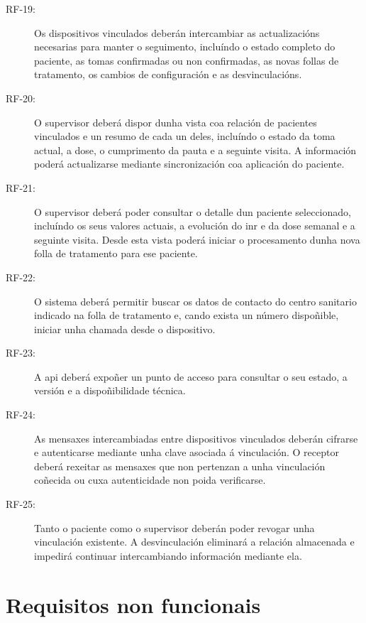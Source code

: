 \begin{description}
\item[RF-19:] Os dispositivos vinculados deberán intercambiar as actualizacións necesarias para manter o seguimento, incluíndo o estado completo do paciente, as tomas confirmadas ou non confirmadas, as novas follas de tratamento, os cambios de configuración e as desvinculacións.

\item[RF-20:] O supervisor deberá dispor dunha vista coa relación de pacientes vinculados e un resumo de cada un deles, incluíndo o estado da toma actual, a dose, o cumprimento da pauta e a seguinte visita. A información poderá actualizarse mediante sincronización coa aplicación do paciente.

\item[RF-21:] O supervisor deberá poder consultar o detalle dun paciente seleccionado, incluíndo os seus valores actuais, a evolución do \gls{inr} e da dose semanal e a seguinte visita. Desde esta vista poderá iniciar o procesamento dunha nova folla de tratamento para ese paciente.

\item[RF-22:] O sistema deberá permitir buscar os datos de contacto do centro sanitario indicado na folla de tratamento e, cando exista un número dispoñible, iniciar unha chamada desde o dispositivo.

\item[RF-23:] A \gls{api} deberá expoñer un punto de acceso para consultar o seu estado, a versión e a dispoñibilidade técnica.

\item[RF-24:] As mensaxes intercambiadas entre dispositivos vinculados deberán cifrarse e autenticarse mediante unha clave asociada á vinculación. O receptor deberá rexeitar as mensaxes que non pertenzan a unha vinculación coñecida ou cuxa autenticidade non poida verificarse.

\item[RF-25:] Tanto o paciente como o supervisor deberán poder revogar unha vinculación existente. A desvinculación eliminará a relación almacenada e impedirá continuar intercambiando información mediante ela.


\end{description}

\section{Requisitos non funcionais}
\label{sec:requisitos-non-funcionais}

